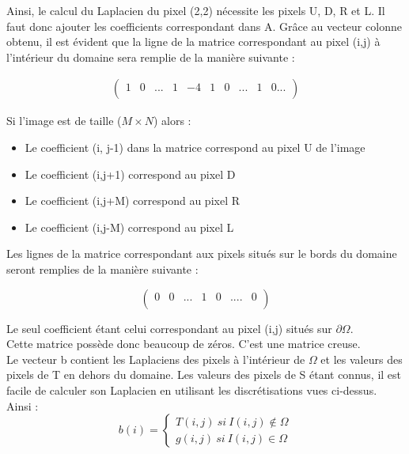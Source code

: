 Ainsi, le calcul du Laplacien du pixel (2,2) nécessite les pixels U, D, R et L. Il faut donc ajouter les coefficients correspondant dans A. Grâce au vecteur colonne obtenu, il est évident que la ligne de la matrice correspondant au pixel (i,j) à l'intérieur du domaine sera remplie de la manière  suivante : 
\begin{center}
\begin{equation}
\left.
\begin{aligned}
\begin{pmatrix}
	1 & 0 & ... &  1 &-4 & 1 & 0 & ... & 1 & 0... \\
\end{pmatrix}
\end{aligned}
\right.
\end{equation}
\end{center}
Si l'image est de taille ($M\times N$) alors : 
\begin{itemize}
\item Le coefficient (i, j-1) dans la matrice correspond au pixel U de l'image
\item Le coefficient (i,j+1) correspond au pixel D
\item Le coefficient (i,j+M) correspond au pixel R
\item Le coefficient (i,j-M) correspond au pixel L
\end{itemize}

Les lignes de la matrice correspondant aux pixels situés sur le bords du domaine seront remplies de la manière suivante : 
\begin{center}
\begin{equation}
\begin{pmatrix}
0 & 0 & ... & 1& 0& ....& 0\\
\end{pmatrix}
\end{equation}
\end{center}
Le seul coefficient étant celui correspondant au pixel (i,j) situés sur $\partial \Omega$. \\
Cette matrice possède donc beaucoup de zéros. C'est une matrice creuse.\\
Le vecteur b contient les Laplaciens des pixels à l'intérieur de $\Omega$ et les valeurs des pixels de T en dehors du domaine. 
Les valeurs des pixels de S étant connus, il est facile de calculer son Laplacien en utilisant les discrétisations vues ci-dessus. Ainsi : 
\begin{equation*}
b(i) = 
\left\{
\begin{aligned}
T(i,j) \ si \ I (i,j) \notin \Omega\\
g(i,j) \ si \ I( i,j) \in \Omega
\end{aligned}
\right.
\end{equation*}

